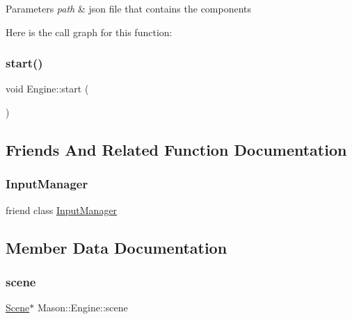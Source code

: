 \begin{DoxyParams}{Parameters}
{\em path} & json file that contains the components \\
\hline
\end{DoxyParams}
Here is the call graph for this function\+:
\hypertarget{class_mason_1_1_engine_a4d8066dd213a03f5420d1bf60f150ca7}{}\label{class_mason_1_1_engine_a4d8066dd213a03f5420d1bf60f150ca7} 
\subsubsection{\texorpdfstring{start()}{start()}}
{\footnotesize\ttfamily void Engine\+::start (\begin{DoxyParamCaption}{ }\end{DoxyParamCaption})}



\subsection{Friends And Related Function Documentation}
\hypertarget{class_mason_1_1_engine_af0e8c3dcc20b7ddcaf63506363a22821}{}\label{class_mason_1_1_engine_af0e8c3dcc20b7ddcaf63506363a22821} 
\subsubsection{\texorpdfstring{Input\+Manager}{InputManager}}
{\footnotesize\ttfamily friend class \hyperlink{class_mason_1_1_input_manager}{Input\+Manager}\hspace{0.3cm}{\ttfamily [friend]}}



\subsection{Member Data Documentation}
\hypertarget{class_mason_1_1_engine_a2ec6bc225a9327484dde73bb8298ea85}{}\label{class_mason_1_1_engine_a2ec6bc225a9327484dde73bb8298ea85} 
\subsubsection{\texorpdfstring{scene}{scene}}
{\footnotesize\ttfamily \hyperlink{class_mason_1_1_scene}{Scene}$\ast$ Mason\+::\+Engine\+::scene}



